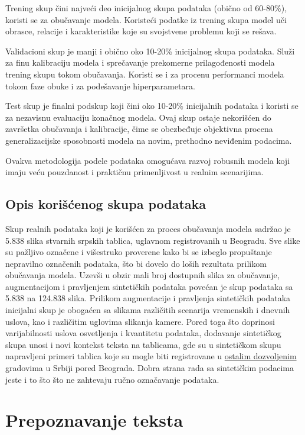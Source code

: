 \documentclass[a4paper,12pt]{article}
\begin{document}
	Trening skup čini najveći deo inicijalnog skupa podataka (obično od 60-80\%), koristi se za obučavanje modela. Koristeći podatke iz trening skupa model uči obrasce, relacije i karakteristike koje su svojstvene problemu koji se rešava.
	
	Validacioni skup je manji i obično oko 10-20\% inicijalnog skupa podataka. Služi za finu kalibraciju modela i sprečavanje prekomerne prilagođenosti modela trening skupu tokom obučavanja. Koristi se i za procenu performanci modela tokom faze obuke i za podešavanje hiperparametara.
	
	Test skup je finalni podskup koji čini oko 10-20\% inicijalnih podataka i koristi se za nezavisnu evaluaciju konačnog modela. Ovaj skup ostaje nekorišćen do završetka obučavanja i kalibracije, čime se obezbeđuje objektivna procena generalizacijske sposobnosti modela na novim, prethodno neviđenim podacima.
	
	Ovakva metodologija podele podataka omogućava razvoj robusnih modela koji imaju veću pouzdanost i praktičnu primenljivost u realnim scenarijima.
	
	\subsection{Opis korišćenog skupa podataka}
	Skup realnih podataka koji je korišćen za proces obučavanja modela sadržao je 5.838 slika stvarnih srpskih tablica, uglavnom registrovanih u Beogradu. Sve slike su pažljivo označene i višestruko proverene kako bi se izbeglo propuštanje nepravilno označenih podataka, što bi dovelo do loših rezultata prilikom obučavanja modela. Uzevši u obzir mali broj dostupnih slika za obučavanje, augmentacijom i pravljenjem sintetičkih podataka povećan je skup podataka sa 5.838 na 124.838 slika. Prilikom augmentacije i pravljenja sintetičkih podataka inicijalni skup je obogaćen sa slikama različitih scenarija vremenskih i dnevnih uslova, kao i različitim uglovima slikanja kamere. Pored toga što doprinosi varijabilnosti uslova osvetljenja i kvantitetu podataka, dodavanje sintetičkog skupa unosi i novi kontekst teksta na tablicama, gde su u sintetičkom skupu napravljeni primeri tablica koje su mogle biti registrovane u \href{https://www.super-registracija-vozila.rs/registarske-oznake-u-srbiji}{ostalim dozvoljenim} \cite{srbRegistracija} gradovima u Srbiji pored Beograda. Dobra strana rada sa sintetičkim podacima jeste i to što što ne zahtevaju ručno označavanje podataka.
	\newpage
	
	\section{Prepoznavanje teksta}
\end{document}
